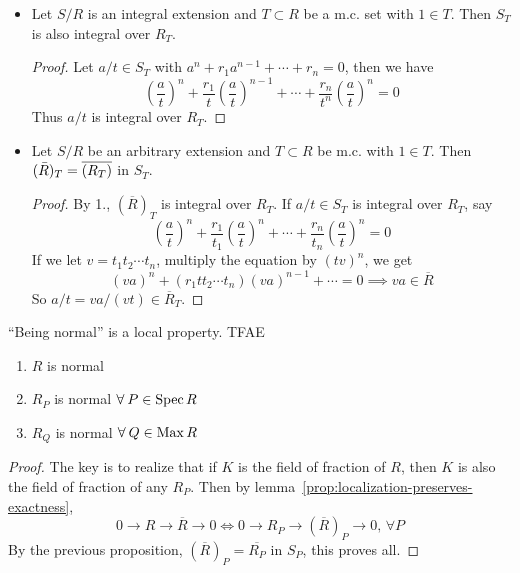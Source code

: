 \begin{prop} \mbox{}
  \begin{itemize}
    \item Let $S/R$ is an integral extension and $T \subset R$ be a m.c. set
      with $1 \in T$.
      Then $S_T$ is also integral over $R_T$.

    \begin{proof}
      Let $a/t \in S_T$ with $a^n + r_1 a^{n-1} + \dotsb + r_n = 0$,
      then we have
      \[ \left(\frac{a}{t}\right)^n +
          \frac{r_1}{t}\left(\frac{a}{t}\right)^{n-1} +
          \dotsb +
          \frac{r_n}{t^n}\left(\frac{a}{t}\right)^n = 0 \]
        Thus $a/t$ is integral over $R_T$.
    \end{proof}
    \item Let $S/R$ be an arbitrary extension and $T \subset R$ be m.c.
      with $1 \in T$. Then $(\bar{R})_T = \overline{(R_T)}$ in $S_T$.

    \begin{proof}
      By 1., $(\overline{R})_T$ is integral over $R_T$.
      If $a/t \in S_T$ is integral over $R_T$, say
      \[ \left(\frac{a}{t}\right)^n +
          \frac{r_1}{t_1}\left(\frac{a}{t}\right)^n +
          \dotsb +
          \frac{r_n}{t_n}\left(\frac{a}{t}\right)^n = 0 \]
      If we let $v = t_1 t_2 \dotsm t_n$,
      multiply the equation by $(tv)^n$, we get
      \[ (va)^n +
          (r_1 t t_2 \dotsm t_n) (v a)^{n-1} +
          \dotsb = 0 \implies va \in \overline{R} \]
      So $a/t = va / (vt) \in \overline{R}_T$.
    \end{proof}
  \end{itemize}
\end{prop}

\begin{prop}
  ``Being normal'' is a local property. TFAE
  \begin{enumerate}[(1)]
    \item $R$ is normal
    \item $R_P$ is normal $\forall P \in \Spec R$
    \item $R_Q$ is normal $\forall Q \in \Max R$
  \end{enumerate}

  \begin{proof}
    The key is to realize that if $K$ is the field of fraction of $R$,
    then $K$ is also the field of fraction of any $R_P$. Then by
    lemma~\ref{prop:localization-preserves-exactness},
    \[ 0 \to R \to \overline{R} \to 0 \iff 0 \to R_P \to (\overline{R})_P \to 0, \, \forall P \]
    By the previous proposition, $(\overline{R})_P = \overline{R_P}$ in $S_P$, this proves all.
  \end{proof}
\end{prop}

